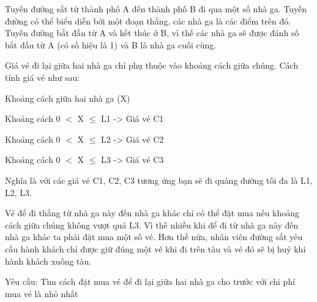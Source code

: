 Tuyến đường sắt từ thành phố A đến thành phố B đi qua một số nhà ga. Tuyến đường có thể biểu diễn bởi một đoạn thẳng, các nhà ga là các điểm trên đó. Tuyến đường bắt đầu từ A và kết thúc ở B, vì thế các nhà ga sẽ được đánh số bắt đầu từ A (có số hiệu là 1) và B là nhà ga cuối cùng.  

   Giá vé đi lại giữa hai nhà ga chỉ phụ thuộc vào khoảng cách giữa chúng. Cách tính giá vé như sau:  

   Khoảng cách giữa hai nhà ga (X)  

   Khoảng cách 0 $<$ X  $\le$  L1      -> Giá vé              C1  

   Khoảng cách 0 $<$ X  $\le$  L2     -> Giá vé              C2  

   Khoảng cách 0 $<$ X  $\le$  L3     -> Giá vé              C3  

   Nghĩa là với các giá vé C1, C2, C3 tương ứng bạn sẽ đi quảng đường tối đa là L1, L2, L3.  

   Vé để đi thẳng từ nhà ga này đến nhà ga khác chỉ có thể đặt mua nếu khoảng cách giữa chúng không vượt quá L3. Vì thế nhiều khi để đi từ nhà ga này đến nhà ga khác ta phải đặt mua một số vé. Hơn thế nữa, nhân viên đường sắt yêu cầu hành khách chỉ được giữ đúng một vé khi đi trên tàu và vé đó sẽ bị huỷ khi hành khách xuống tàu.  

   Yêu cầu: Tìm cách đặt mua vé để đi lại giữa hai nhà ga cho trước với chi phí mua vé là nhỏ nhất
